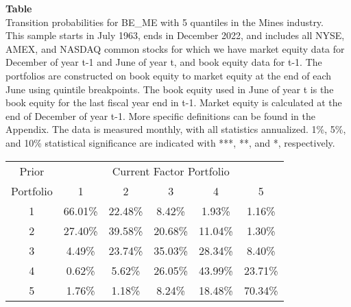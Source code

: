 \begin{table*}[ht!]
\raggedright
{}
\label{tab: transition_probs_BE_ME_Mines_with_5_quantiles}
\textbf{Table \thetable} \\
Transition probabilities for BE_ME with 5 quantiles in the Mines industry. \\
\hspace*{1em}This sample starts in July 1963, ends in December 2022, and includes all NYSE, AMEX, and NASDAQ common stocks for which we have market equity data for December of year t-1 and June of year t, and book equity data for t-1. The portfolios are constructed on book equity to market equity at the end of each June using quintile breakpoints.  The book equity used in June of year t is the book equity for the last fiscal year end in t-1.  Market equity is calculated at the end of December of year t-1.  More specific definitions can be found in the Appendix.  The data is measured monthly, with all statistics annualized.  1\%, 5\%, and 10\% statistical significance are indicated with ***, **, and *, respectively. \\
\vspace{0.5em}
\centering
\begin{adjustbox}{max width=\textwidth}
\begin{tabular}{@{}cccccc@{}}
\toprule
Prior & \multicolumn{5}{c}{Current Factor Portfolio} \\
Portfolio & 1 & 2 & 3 & 4 & 5 \\
\midrule
1 & 66.01\% & 22.48\% & 8.42\% & 1.93\% & 1.16\% \\
2 & 27.40\% & 39.58\% & 20.68\% & 11.04\% & 1.30\% \\
3 & 4.49\% & 23.74\% & 35.03\% & 28.34\% & 8.40\% \\
4 & 0.62\% & 5.62\% & 26.05\% & 43.99\% & 23.71\% \\
5 & 1.76\% & 1.18\% & 8.24\% & 18.48\% & 70.34\% \\
\bottomrule
\end{tabular}
\end{adjustbox}
\end{table*}